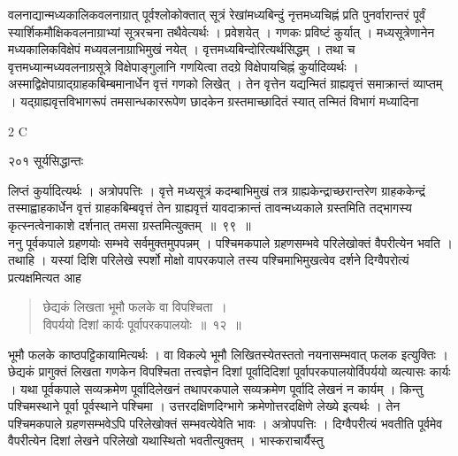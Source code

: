 \documentclass[11pt, openany]{book}
\begin{document}
 वलनाद्यान्मध्यकालिकवलनाग्रात् पूर्वश्लोकोक्तात् सूत्रं रेखांमध्यबिन्दुं नृत्तमध्यचिह्नं प्रति पुनर्वारान्तरं पूर्वं स्यार्शिकमौक्षिकवलनाग्राभ्यां सूत्ररचना तथैवेत्यर्थः । प्रवेशयेत् । गणकः प्रविष्टं कुर्यात् । मध्यसूत्रेणानेन मध्यकालिकविक्षेपं मध्यवलनाग्राभिमुखं नयेत् । वृत्तमध्यबिन्दोरित्यर्थसिद्धम् । तथा च वृत्तमध्यान्मध्यवलनाग्रसूत्रे विक्षेपाङ्गुलानि गणयित्वा तदग्रे विक्षेपायचिह्नं कुर्यादिव्यर्थः । अस्माद्विक्षेपाग्राद्ग्राहकबिम्बमानार्धेन वृत्तं गणको लिखेत् । तेन वृत्तेन यद्यन्मितं ग्राह्यवृत्तं समाक्रान्तं व्याप्तम् । यद्ग्राह्यवृत्तविभागरूपं तमसान्धकाररूपेण छादकेन ग्रस्तमाच्छादितं स्यात् तन्मितं विभागं मध्यादिना


{\tiny{2 C}}

\newpage

\noindent २०१ \hspace{4cm} सूर्यसिद्धान्तः
\vspace{1cm}


\noindent लिप्तं कुर्यादित्यर्थः । अत्रोपपत्तिः । वृत्ते मध्यसूत्रं कदम्बाभिमुखं तत्र ग्राह्यकेन्द्राच्छरान्तरेण ग्राहककेन्द्रं तस्माह्वाहकार्धेन वृत्तं ग्राहकबिम्बवृत्तं तेन ग्राह्यवृत्तं यावदाक्रान्तं तावन्मध्यकाले ग्रस्तमिति तद्भागस्य कृत्स्नत्वेनाकाशे दर्शनात् तमसा ग्रस्तमित्युक्तम्~॥~९९~॥\\
\noindent ननु पूर्वकपाले ग्रहणयोः सम्भवे सर्वमुक्तमुपपन्नम् । पश्चिमकपाले ग्रहणसम्भवे परिलेखोक्तं वैपरीत्येन भवति । तथाहि । यस्यां दिशि परिलेखे स्पर्शो मोक्षो वापरकपाले तस्य पश्चिमाभिमुखत्वेव दर्शने दिग्वैपरोत्यं प्रत्यक्षमित्यत आह\textendash 


\begin{quote}
{\ssi छेद्यकं लिखता भूमौ फलके वा विपश्चिता~।\\
 विपर्ययो दिशां कार्यः पूर्वापरकपालयोः~॥~१२~॥ }
 \end{quote}


 भूमौ फलके काष्ठपट्टिकायामित्यर्थः । वा विकल्पे भूमौ लिखितस्येतस्ततो नयनासम्भवात् फलक इत्युक्तिः । छेद्यकं प्रागुक्तं लिखता गणकेन विपश्चिता तत्त्वज्ञेन दिशां पूर्वादिदिशां पूर्वापरकपालयोर्विपर्ययो व्यत्यासः कार्यः । यथा पूर्वकपाले सव्यक्रमेण पूर्वादिलेखनं तथापरकपाले सव्यक्रमेण पूर्वादि लेखनं न कार्यम् । किन्तु पश्चिमस्थाने पूर्वा पूर्वस्थाने पश्चिमा । उत्तरदक्षिणदिग्भागे क्रमेणोत्तरदक्षिणे लेख्ये इत्यर्थः । तेन पश्चिमकपाले ग्रहणसम्भवेऽपि परिलेखोक्तं सम्भवत्येवेति भावः । अत्रोपपत्तिः । दिग्वैपरीत्यं भवतीति पूर्वमेव वैपरीत्येन दिशां लेखने परिलेखो यथास्थितो भवतीत्युक्तम् । भास्कराचार्यैस्तु\textendash
\end{document}
